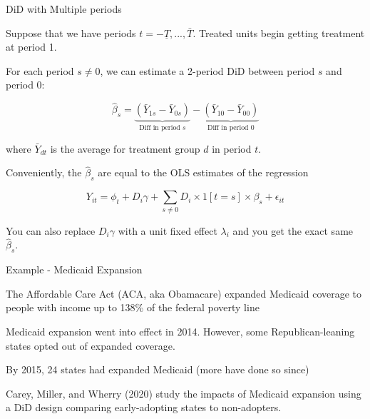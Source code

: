 \documentclass[11pt,english,handout]{beamer}
\newenvironment{wideitemize}{\itemize\addtolength{\itemsep}{10pt}}{\enditemize}
\begin{document}
\begin{frame}{DiD with Multiple periods}
	\begin{wideitemize}
		\item
		Suppose that we have periods $t=-\underline{T},...,\bar{T}$. Treated units begin getting treatment at period 1.
		
		\pause
		\item
		For each period $s \neq 0$, we can estimate a 2-period DiD between period $s$ and period 0:
		
		$$\hat\beta_s = \underbrace{(\bar{Y}_{1s} - \bar{Y}_{0s})}_{\text{Diff in period $s$}} -  \underbrace{(\bar{Y}_{10} - \bar{Y}_{00})}_{\text{Diff in period 0}} $$
		
		\noindent where $\bar{Y}_{dt}$ is the average for treatment group $d$ in period $t$.
		
		\pause
		\item
		Conveniently, the $\hat\beta_s$ are equal to the OLS estimates of the regression
		
		$$Y_{it} =  \phi_{t} + D_i \gamma + \sum_{s\neq 0}  D_i \times 1[t = s] \times  \beta_s   + \epsilon_{it} $$
		
		\pause
		\item
		You can also replace $D_i \gamma$ with a unit fixed effect $\lambda_i$ and you get the exact same $\hat\beta_s$. 
		\end{wideitemize}
\end{frame}

\begin{frame}{Example - Medicaid Expansion}
	
	\begin{wideitemize}
		\item
		The Affordable Care Act (ACA, aka Obamacare) expanded Medicaid coverage to people with income up to 138\% of the federal poverty line
		
		\item
		Medicaid expansion went into effect in 2014. However, some Republican-leaning states opted out of expanded coverage.
		
		\item
		By 2015, 24 states had expanded Medicaid (more have done so since)
		
		\pause
		\item
		Carey, Miller, and Wherry (2020) study the impacts of Medicaid expansion using a DiD design comparing early-adopting states to non-adopters.
				
		
	\end{wideitemize}
	
\end{frame}
\end{document}
